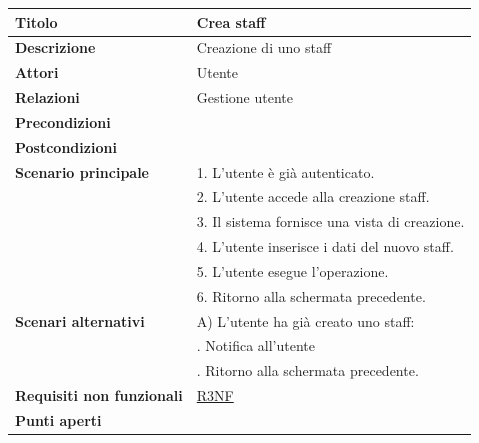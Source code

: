 \documentclass[a4paper]{article}
\begin{document}
\begin{center}
\begin{tabularx}{1\textwidth}{|l|X|}
    \hline
		\textbf{Titolo} & Crea staff \\
		\hline
		\textbf{Descrizione} & Creazione di uno staff \\
		\hline
		\textbf{Attori} & Utente \\
		\hline
		\textbf{Relazioni} & Gestione utente \\
		\hline
		\textbf{Precondizioni} &  \\
		\hline
		\textbf{Postcondizioni} &  \\
		\hline
		\textbf{Scenario principale} & 1. L'utente è già autenticato.\\
		                             & 2. L'utente accede alla creazione staff. \\
									 & 3. Il sistema fornisce una vista di creazione. \\
									 & 4. L'utente inserisce i dati del nuovo staff. \\
									 & 5. L'utente esegue l'operazione.\\
									 & 6. Ritorno alla schermata precedente.\\
		\hline
		\textbf{Scenari alternativi} & A) L'utente ha già creato uno staff: \\
									 & \quad 1. Notifica all'utente \\
									 & \quad 2. Ritorno alla schermata precedente.\\
		\hline
		\textbf{Requisiti non funzionali} & \hyperlink{R3NF}{R3NF} \\
		\hline
		\textbf{Punti aperti} & \\
		\hline
	\end{tabularx}
\end{center}

\end{document}

